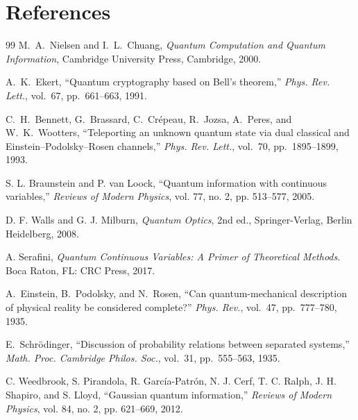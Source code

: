 
\chapter{References}


\begin{thebibliography}{99}
	M.~A.~Nielsen and I.~L.~Chuang,
	\textit{Quantum Computation and Quantum Information},
	Cambridge University Press, Cambridge, 2000.
	
	A.~K.~Ekert,
	``Quantum cryptography based on Bell's theorem,''
	\textit{Phys. Rev. Lett.}, vol.~67, pp.~661--663, 1991.
	
	C.~H.~Bennett, G.~Brassard, C.~Cr\'epeau, R.~Jozsa, A.~Peres, and W.~K.~Wootters,
	``Teleporting an unknown quantum state via dual classical and Einstein--Podolsky--Rosen channels,''
	\textit{Phys. Rev. Lett.}, vol.~70, pp.~1895--1899, 1993.
	
	
	S. L. Braunstein and P. van Loock, ``Quantum information with continuous variables,'' \textit{Reviews of Modern Physics}, vol. 77, no. 2, pp. 513--577, 2005.
	
	D. F. Walls and G. J. Milburn,
	\textit{Quantum Optics},
	2nd ed., Springer-Verlag, Berlin Heidelberg, 2008.
	
	A. Serafini, \textit{Quantum Continuous Variables: A Primer of Theoretical Methods}. Boca Raton, FL: CRC Press, 2017.
	
	A.~Einstein, B.~Podolsky, and N.~Rosen,
	``Can quantum-mechanical description of physical reality be considered complete?''
	\textit{Phys. Rev.}, vol.~47, pp.~777--780, 1935.
	
	E.~Schr\"odinger,
	``Discussion of probability relations between separated systems,''
	\textit{Math. Proc. Cambridge Philos. Soc.}, vol.~31, pp.~555--563, 1935.
	
	C. Weedbrook, S. Pirandola, R. Garc{\'i}a-Patr{\'o}n, N. J. Cerf, T. C. Ralph, J. H. Shapiro, and S. Lloyd, 
	``Gaussian quantum information,'' 
	\textit{Reviews of Modern Physics}, vol. 84, no. 2, pp. 621--669, 2012.
	

\end{thebibliography}
